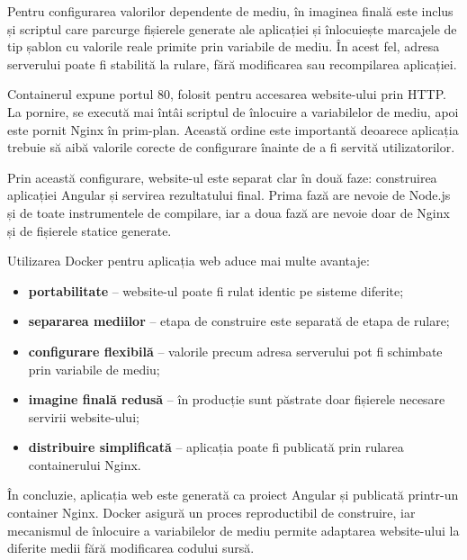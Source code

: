 Pentru configurarea valorilor dependente de mediu, în imaginea finală este inclus și scriptul care parcurge fișierele generate ale aplicației și înlocuiește marcajele de tip șablon cu valorile reale primite prin variabile de mediu. În acest fel, adresa serverului poate fi stabilită la rulare, fără modificarea sau recompilarea aplicației.

Containerul expune portul 80, folosit pentru accesarea website-ului prin HTTP. La pornire, se execută mai întâi scriptul de înlocuire a variabilelor de mediu, apoi este pornit Nginx în prim-plan. Această ordine este importantă deoarece aplicația trebuie să aibă valorile corecte de configurare înainte de a fi servită utilizatorilor.

Prin această configurare, website-ul este separat clar în două faze: construirea aplicației Angular și servirea rezultatului final. Prima fază are nevoie de Node.js și de toate instrumentele de compilare, iar a doua fază are nevoie doar de Nginx și de fișierele statice generate.

Utilizarea Docker pentru aplicația web aduce mai multe avantaje:
\begin{itemize}
    \item \textbf{portabilitate} -- website-ul poate fi rulat identic pe sisteme diferite;
    \item \textbf{separarea mediilor} -- etapa de construire este separată de etapa de rulare;
    \item \textbf{configurare flexibilă} -- valorile precum adresa serverului pot fi schimbate prin variabile de mediu;
    \item \textbf{imagine finală redusă} -- în producție sunt păstrate doar fișierele necesare servirii website-ului;
    \item \textbf{distribuire simplificată} -- aplicația poate fi publicată prin rularea containerului Nginx.
\end{itemize}

În concluzie, aplicația web este generată ca proiect Angular și publicată printr-un container Nginx. Docker asigură un proces reproductibil de construire, iar mecanismul de înlocuire a variabilelor de mediu permite adaptarea website-ului la diferite medii fără modificarea codului sursă.
